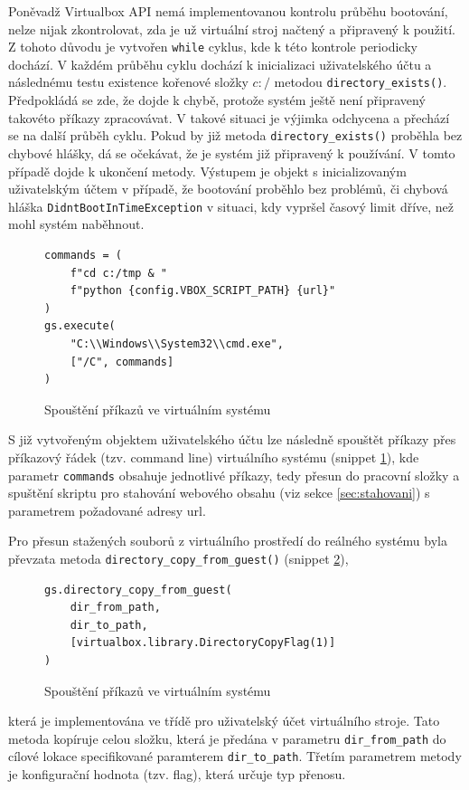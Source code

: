\documentclass[thesis=M,czech,hidelinks]{FITthesis}[2013/05/06]
\begin{document}
Poněvadž Virtualbox API nemá implementovanou kontrolu průběhu bootování, nelze nijak zkontrolovat, zda je už virtuální stroj načtený a připravený k použití. Z tohoto důvodu je vytvořen \texttt{while} cyklus, kde k této kontrole periodicky dochází. V každém průběhu cyklu dochází k inicializaci uživatelského účtu a následnému testu existence kořenové složky $c:/$ metodou \texttt{directory_exists()}. Předpokládá se zde, že dojde k chybě, protože systém ještě není připravený takovéto příkazy zpracovávat. V takové situaci je výjimka odchycena a přechází se na další průběh cyklu. Pokud by již metoda \texttt{directory_exists()} proběhla bez chybové hlášky, dá se očekávat, že je systém již připravený k používání. V tomto případě dojde k ukončení metody. Výstupem je objekt s inicializovaným uživatelským účtem v případě, že bootování proběhlo bez problémů, či chybová hláška \texttt{DidntBootInTimeException} v situaci, kdy vypršel časový limit dříve, než mohl systém naběhnout.

\begin{figure}[h]               
	\begin{verbatim}
commands = (
    f"cd c:/tmp & "
    f"python {config.VBOX_SCRIPT_PATH} {url}"
)
gs.execute(
    "C:\\Windows\\System32\\cmd.exe", 
    ["/C", commands]
)
	\end{verbatim}      
	\caption{Spouštění příkazů ve virtuálním systému}
	\label{snip:vboxcommand}
\end{figure}
S již vytvořeným objektem uživatelského účtu lze následně spouštět příkazy přes příkazový řádek (tzv. command line) virtuálního systému (snippet \ref{snip:vboxcommand}), kde parametr \texttt{commands} obsahuje jednotlivé příkazy, tedy přesun do pracovní složky a spuštění skriptu pro stahování webového obsahu (viz sekce \ref{sec:stahovani}) s parametrem požadované adresy url.

Pro přesun stažených souborů z virtuálního prostředí do reálného systému byla převzata metoda \texttt{directory_copy_from_guest()} (snippet \ref{snip:vboxcopy}),
\begin{figure}[h]               
	\begin{verbatim}
gs.directory_copy_from_guest(
    dir_from_path,
    dir_to_path,
    [virtualbox.library.DirectoryCopyFlag(1)]
)
	\end{verbatim}      
	\caption{Spouštění příkazů ve virtuálním systému}
	\label{snip:vboxcopy}
\end{figure}
 která je implementována ve třídě pro uživatelský účet virtuálního stroje. Tato metoda kopíruje celou složku, která je předána v parametru \texttt{dir_from_path} do cílové lokace specifikované paramterem \texttt{dir_to_path}. Třetím parametrem metody je konfigurační hodnota (tzv. flag), která určuje typ přenosu.
\end{document}
